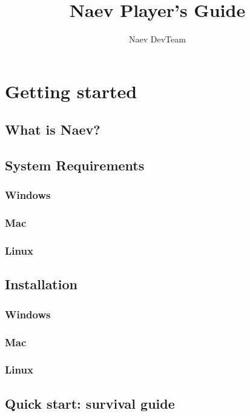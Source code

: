 \documentclass{article}
\title{Naev Player's Guide}
\author{Naev DevTeam}
\begin{document}

\maketitle

\section{Getting started}

\subsection{What is Naev?}

\subsection{System Requirements}
\subsubsection{Windows}
\subsubsection{Mac}
\subsubsection{Linux}

\subsection{Installation}
\subsubsection{Windows}
\subsubsection{Mac}
\subsubsection{Linux}

\subsection{Quick start: survival guide}
\end{document}
